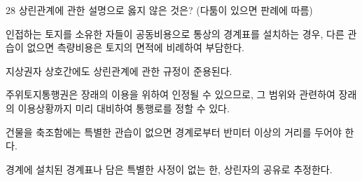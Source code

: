 \begin{question}{28}
상린관계에 관한 설명으로 옳지 않은 것은? (다툼이 있으면 판례에 따름)
\begin{choices}
  \item 인접하는 토지를 소유한 자들이 공동비용으로 통상의 경계표를 설치하는 경우, 다른 관습이 없으면 측량비용은 토지의 면적에 비례하여 부담한다.
  \item 지상권자 상호간에도 상린관계에 관한 규정이 준용된다.
  \item 주위토지통행권은 장래의 이용을 위하여 인정될 수 있으므로, 그 범위와 관련하여 장래의 이용상황까지 미리 대비하여 통행로를 정할 수 있다.
  \item 건물을 축조함에는 특별한 관습이 없으면 경계로부터 반미터 이상의 거리를 두어야 한다.
  \item 경계에 설치된 경계표나 담은 특별한 사정이 없는 한, 상린자의 공유로 추정한다.
\end{choices}
\end{question}
